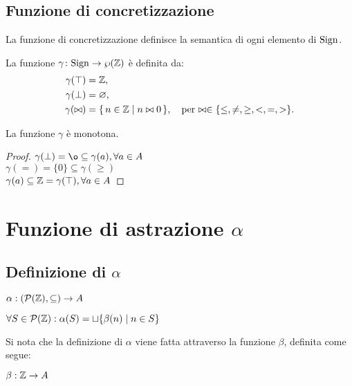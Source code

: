 \subsection{Funzione di concretizzazione}

La funzione di concretizzazione definisce la semantica di ogni
elemento di $\mathrm{Sign}$.
\begin{definizione} 
La funzione $\mathord{\gamma}\colon\mathrm{Sign}\to\wp(\mathbb{Z})$ è definita
da:
\begin{align*}
  \gamma(\top) &= \mathbb{Z}, \\
  \gamma(\bot) &= \varnothing, \\
  \gamma(\bowtie) &= \{\, n \in \mathbb{Z} \mid n \bowtie 0 \,\},
    \quad\text{per $\bowtie \in \{ \leq, \neq, \geq, <, =, > \}$.}
\end{align*}
\end{definizione}

\begin{proposizione}
La funzione $\gamma$ è monotona.
\end{proposizione}
\begin{proof}
	$ \gamma(\bot) = \o \subseteq \gamma(a) , \forall a \in A $ \\
	$ \gamma(=) = \{0\} \subseteq \gamma(\geq) $ \\
	$ \gamma(a) \subseteq \mathbb{Z} = \gamma(\top), \forall a \in A $
\end{proof}

\section{Funzione di astrazione $\alpha$}

\subsection{Definizione di $\alpha$}
\begin{center}
	$ \alpha : (\mathcal{P}{(\mathbb{Z}), \subseteq)} \rightarrow A $
\end{center}
\begin{center}
	$ \forall S \in \mathcal{P}(\mathbb{Z}) : \alpha(S) = \sqcup \{ \beta(n) \mid n \in S \} $
\end{center}
Si nota che la definizione di $\alpha$ viene fatta attraverso la funzione $\beta$, definita come segue:
\begin{center}
	$ \beta: \mathbb{Z} \rightarrow A  $
\end{center}

